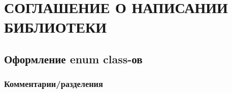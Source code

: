 \chapter{СОГЛАШЕНИЕ О НАПИСАНИИ БИБЛИОТЕКИ}


\section{Оформление enum class-ов}
\subsection{Комментарии/разделения}
\fi